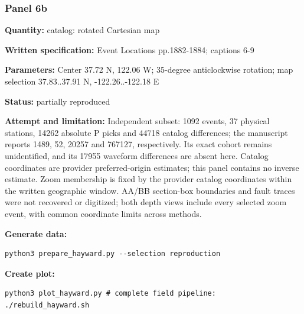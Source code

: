 \subsubsection*{Panel 6b}
\noindent\textbf{Quantity:} catalog: rotated Cartesian map\par
\noindent\textbf{Written specification:} Event Locations pp.1882-1884; captions 6-9\par
\noindent\textbf{Parameters:} Center 37.72 N, 122.06 W; 35-degree anticlockwise rotation; map selection 37.83..37.91 N, -122.26..-122.18 E\par
\noindent\textbf{Status:} partially reproduced\par
\noindent\textbf{Attempt and limitation:} Independent subset: 1092 events, 37 physical stations, 14262 absolute P picks and 44718 catalog differences; the manuscript reports 1489, 52, 20257 and 767127, respectively. Its exact cohort remains unidentified, and its 17955 waveform differences are absent here. Catalog coordinates are provider preferred-origin estimates; this panel contains no inverse estimate. Zoom membership is fixed by the provider catalog coordinates within the written geographic window. AA/BB section-box boundaries and fault traces were not recovered or digitized; both depth views include every selected zoom event, with common coordinate limits across methods.\par
\noindent\textbf{Generate data:}
\begin{lstlisting}
python3 prepare_hayward.py --selection reproduction
\end{lstlisting}
\noindent\textbf{Create plot:}
\begin{lstlisting}
python3 plot_hayward.py # complete field pipeline: ./rebuild_hayward.sh
\end{lstlisting}
